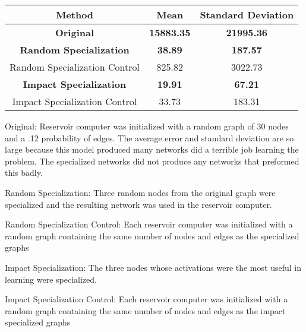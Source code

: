 \documentclass{paper}
\begin{document}
\begin{table*}[]
\centering
\label{table:3}
\begin{tabular}{|| c || c | c ||}
\hline
Method &  Mean & Standard Deviation \\
\hline
\textbf{Original} & \textbf{15883.35} &  \textbf{21995.36} \\
\textbf{Random Specialization} & \textbf{38.89} & \textbf{187.57} \\
Random Specialization Control &  825.82 & 3022.73 \\
\textbf{Impact Specialization} &  \textbf{19.91} & \textbf{67.21}  \\
Impact Specialization Control &  33.73 & 183.31 \\
\hline
\end{tabular}

\end{table*}

Original: Reservoir computer was initialized with a random graph of 30 nodes and a .12 probability of edges. The average error and standard deviation are so large because this model produced many networks did a terrible job learning the problem. The specialized networks did not produce any networks that preformed this badly.

Random Specialization: Three random nodes from the original graph were specialized and the resulting network was used in the reservoir computer.

Random Specialization Control: Each reservoir computer was initialized with a random graph containing the same number of nodes and edges as the specialized graphs

Impact Specialization: The three nodes whose activations were the most useful in learning were specialized.

Impact Specialization Control: Each reservoir computer was initialized with a random graph containing the same number of nodes and edges as  the impact specialized graphs
\end{document}
